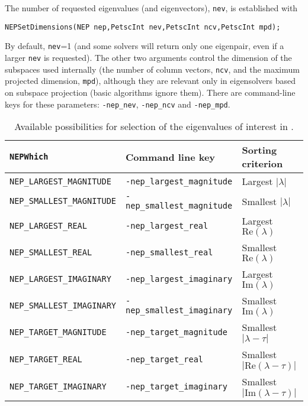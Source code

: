 	The number of requested eigenvalues (and eigenvectors), \texttt{nev}, is established with
	\begin{Verbatim}[fontsize=\small]
	NEPSetDimensions(NEP nep,PetscInt nev,PetscInt ncv,PetscInt mpd);
	\end{Verbatim}
By default, \texttt{nev}=1 (and some solvers will return only one eigenpair, even if a larger \texttt{nev} is requested). The other two arguments control the dimension of the subspaces used internally (the number of column vectors, \texttt{ncv}, and the maximum projected dimension, \texttt{mpd}), although they are relevant only in eigensolvers based on subspace projection (basic algorithms ignore them). There are command-line keys for these parameters: \Verb!-nep_nev!, \Verb!-nep_ncv! and \Verb!-nep_mpd!.

\begin{table}
\centering
{\small \begin{tabular}{lll}
\texttt{NEPWhich}                  & Command line key                   & Sorting criterion \\\hline
\texttt{NEP\_LARGEST\_MAGNITUDE}   & \texttt{-nep\_largest\_magnitude}  & Largest $|\lambda|$ \\
\texttt{NEP\_SMALLEST\_MAGNITUDE}  & \texttt{-nep\_smallest\_magnitude} & Smallest $|\lambda|$ \\
\texttt{NEP\_LARGEST\_REAL}        & \texttt{-nep\_largest\_real}       & Largest $\mathrm{Re}(\lambda)$ \\
\texttt{NEP\_SMALLEST\_REAL}       & \texttt{-nep\_smallest\_real}      & Smallest $\mathrm{Re}(\lambda)$ \\
\texttt{NEP\_LARGEST\_IMAGINARY}   & \texttt{-nep\_largest\_imaginary}  & Largest $\mathrm{Im}(\lambda)$ \\
\texttt{NEP\_SMALLEST\_IMAGINARY}  & \texttt{-nep\_smallest\_imaginary} & Smallest $\mathrm{Im}(\lambda)$ \\\hline
\texttt{NEP\_TARGET\_MAGNITUDE}    & \texttt{-nep\_target\_magnitude}   & Smallest $|\lambda-\tau|$ \\
\texttt{NEP\_TARGET\_REAL}         & \texttt{-nep\_target\_real}        & Smallest $|\mathrm{Re}(\lambda-\tau)|$ \\
\texttt{NEP\_TARGET\_IMAGINARY}    & \texttt{-nep\_target\_imaginary}   & Smallest $|\mathrm{Im}(\lambda-\tau)|$ \\\hline
\end{tabular} }
\caption{\label{tab:portionn}Available possibilities for selection of the eigenvalues of interest in .}
\end{table}

